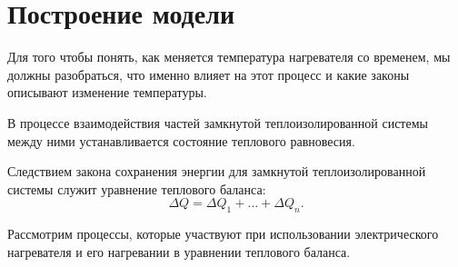 \pagebreak

\section{Построение модели}
	
	Для того чтобы понять, как меняется температура нагревателя со временем, мы должны разобраться, что именно влияет на этот процесс и какие законы описывают изменение температуры.

	В процессе взаимодействия частей замкнутой теплоизолированной системы между ними устанавливается состояние теплового равновесия.

	Следствием закона сохранения энергии для замкнутой теплоизолированной системы служит уравнение теплового баланса:
	\begin{equation}
		\Delta Q = \Delta Q_1 + \dots + \Delta Q_n. \label{q_balance}
	\end{equation}

	Рассмотрим процессы, которые участвуют при использовании электрического нагревателя и его нагревании в уравнении теплового баланса.

